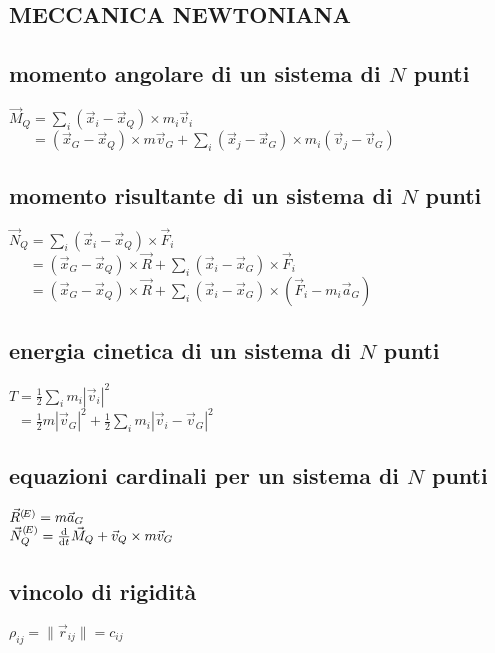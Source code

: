 \documentclass[10pt,a4paper,landscape]{article}
\begin{document}
\begin{multicols}{3}
\setlength{\premulticols}{1pt}
\setlength{\postmulticols}{1pt}
\setlength{\multicolsep}{1pt}
\setlength{\columnsep}{2pt}

\raggedright
\footnotesize

\section{MECCANICA NEWTONIANA}
	\subsection{momento angolare di un sistema di $N$ punti}
	$\vec M_Q=\sum_i (\vec x_i-\vec x_Q)\times m_i\vec v_i$\\
	$\phantom{M_Q}=(\vec x_G-\vec x_Q)\times m\vec v_G+\sum_i(\vec x_j-\vec x_G)\times m_i(\vec v_j-\vec v_G)$\\

	\subsection{momento risultante di un sistema di $N$ punti}
	$\vec N_Q=\sum_i (\vec x_i-\vec x_Q)\times \vec F_i$\\
	$\phantom{N_Q}=(\vec x_G-\vec x_Q)\times \vec R+\sum_i (\vec x_i-\vec x_G)\times \vec F_i$\\
	$\phantom{N_Q}=(\vec x_G-\vec x_Q)\times \vec R+\sum_i (\vec x_i-\vec x_G)\times (\vec F_i-m_i\vec a_G)$\\

	\subsection{energia cinetica di un sistema di $N$ punti}
	$T=\frac1 2 \sum_i m_i |\vec v_i|^2$\\
	$\phantom{T}=\frac1 2 m |\vec v_G|^2+\frac1 2 \sum_i m_i|\vec v_i-\vec v_G|^2$\\

	\subsection{equazioni cardinali per un sistema di $N$ punti}
	$\vec R^{\tiny{(\!E)}}=m\vec a_G$\\
	$\vec N_Q^{\tiny{(\!E)}}= \frac{\mathrm d}{\mathrm d t}\vec M_Q+\vec v_Q\times m\vec v_G$\\

	\subsection{vincolo di rigidità}
	$\rho_{ij}=\|\vec r_{ij}\|=c_{ij}$\\


\end{multicols}
\end{document}
